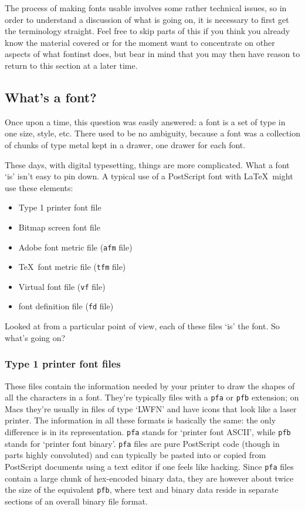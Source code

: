 \documentclass[a4paper]{ltxguide}
\newcommand{\PS}{Post\-Script\xspace}
\newcommand*{\setfilename}[1]{\texttt{#1}}
\newcommand*{\setpackagename}[1]{\textsf{#1}}
\newcommand{\fontinst}{\setpackagename{font\-inst}\xspace}
\newcommand{\vf} {\setfilename{vf}\xspace}
\newcommand{\fd} {\setfilename{fd}\xspace}
\newcommand{\afm}{\setfilename{afm}\xspace}
\newcommand{\tfm}{\setfilename{tfm}\xspace}
\newcommand{\pfa}{\setfilename{pfa}\xspace}
\newcommand{\pfb}{\setfilename{pfb}\xspace}
\begin{document}
The process of making fonts usable involves some rather technical 
issues, so in order to understand a discussion of what is going on, 
it is necessary to first get the terminology straight. Feel free to 
skip parts of this if you think you already know the material covered 
or for the moment want to concentrate on other aspects of what 
\fontinst does, but bear in mind that you may then have reason to return 
to this section at a later time.


\subsection{What's a font?}

Once upon a time, this question was easily answered: a font is a
set of type in one size, style, etc.  There used to be no
ambiguity, because a font was a collection of chunks of type metal
kept in a drawer, one drawer for each font.

These days, with digital typesetting, things are more complicated.
What a font `is' isn't easy to pin down.  A typical use of a \PS
font with \LaTeX\ might use these elements:
\begin{itemize}
\item Type 1 printer font file
\item Bitmap screen font file
\item Adobe font metric file (\afm file)
\item \TeX\ font metric file (\tfm file)
\item Virtual font file (\vf file)
\item font definition file (\fd file)
\end{itemize}
Looked at from a particular point of view, each of these files
`is' the font.  So what's going on?


\subsubsection{Type 1 printer font files}

These files contain the information needed by your printer to draw
the shapes of all the characters in a font.  They're typically
files with a \pfa or \pfb extension; on Macs they're usually in
files of type `LWFN' and have icons that look like a
laser printer.  The information in all these formats is basically
the same: the only difference is in its representation.  \pfa
stands for `printer font ASCII', while \pfb stands for `printer
font binary'.  \pfa files are pure \PS code (though in parts highly 
convoluted) and can typically be pasted into or copied from \PS 
documents using a text editor if one feels like hacking. Since \pfa 
files contain a large chunk of hex-encoded binary data, they are 
however about twice the size of the equivalent \pfb, where text and 
binary data reside in separate sections of an overall binary file 
format. 
\end{document}
